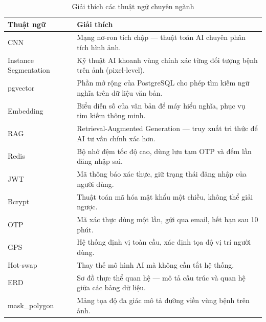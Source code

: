 \documentclass[12pt,a4paper]{article}
\begin{document}
\begin{longtable}{|l|p{11.5cm}|}
    \caption{Giải thích các thuật ngữ chuyên ngành}                                                           \\
    \hline
    \rowcolor{headerblue}
    \textbf{Thuật ngữ}    & \textbf{Giải thích}                                                               \\
    \hline
    CNN                   & Mạng nơ-ron tích chập --- thuật toán AI chuyên phân tích hình ảnh.                \\
    \hline
    Instance Segmentation & Kỹ thuật AI khoanh vùng chính xác từng đối tượng bệnh trên ảnh (pixel-level).     \\
    \hline
    pgvector              & Phần mở rộng của PostgreSQL cho phép tìm kiếm ngữ nghĩa trên dữ liệu văn bản.     \\
    \hline
    Embedding             & Biểu diễn số của văn bản để máy hiểu nghĩa, phục vụ tìm kiếm thông minh.          \\
    \hline
    RAG                   & Retrieval-Augmented Generation --- truy xuất tri thức để AI tư vấn chính xác hơn. \\
    \hline
    Redis                 & Bộ nhớ đệm tốc độ cao, dùng lưu tạm OTP và đếm lần đăng nhập sai.                 \\
    \hline
    JWT                   & Mã thông báo xác thực, giữ trạng thái đăng nhập của người dùng.                   \\
    \hline
    Bcrypt                & Thuật toán mã hóa mật khẩu một chiều, không thể giải ngược.                       \\
    \hline
    OTP                   & Mã xác thực dùng một lần, gửi qua email, hết hạn sau 10 phút.                     \\
    \hline
    GPS                   & Hệ thống định vị toàn cầu, xác định tọa độ vị trí người dùng.                     \\
    \hline
    Hot-swap              & Thay thế mô hình AI mà không cần tắt hệ thống.                                    \\
    \hline
    ERD                   & Sơ đồ thực thể quan hệ --- mô tả cấu trúc và quan hệ giữa các bảng dữ liệu.       \\
    \hline
    mask\_polygon         & Mảng tọa độ đa giác mô tả đường viền vùng bệnh trên ảnh.                          \\
    \hline
\end{longtable}
\end{document}
